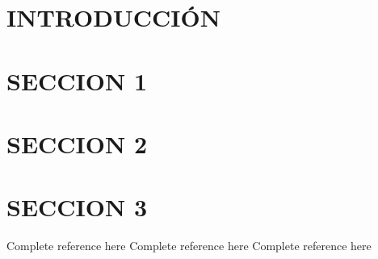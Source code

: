 \section*{INTRODUCCIÓN}
\lipsum[3-5]

\clearpage
\section{SECCION 1}
\lipsum[6-7]

\section{SECCION 2}
\lipsum[8-9]

\section{SECCION 3}
\lipsum[10-12]







\clearpage
\begin{thebibliography}{X}
     Complete reference here
     Complete reference here
     Complete reference here
\end{thebibliography}